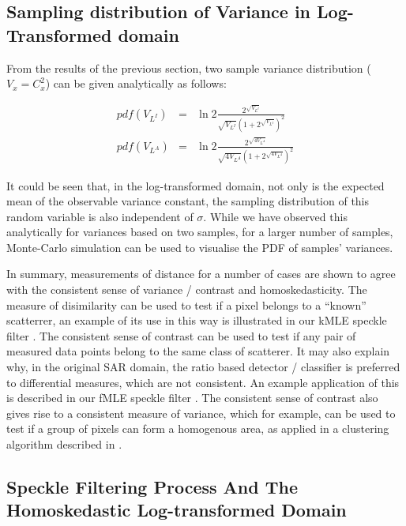 \documentclass[journal]{IEEEtran}
\begin{document}
\subsection{Sampling distribution of Variance in Log-Transformed domain}

From the results of the previous section, two sample variance distribution ($V_x = C_x^2$) can be given analytically as 
follows:

\begin{eqnarray}
pdf(V_{L^I}) &=& 
	\ln2 \frac{ 2^{\sqrt{V_{L^I}}}}{\sqrt{V_{L^I}} \left( 1+2^{\sqrt{V_{L^I}}} \right)^2} \\
pdf(V_{L^A}) &=&
	\ln2 \frac{2^{\sqrt{4V_{L^A}}}}{\sqrt{4V_{L^A}} \left( 1+2^{\sqrt{4V_{L^A}}} \right)^2} 
\end{eqnarray}

It could be seen that, in the log-transformed domain, not only is the expected mean of the observable variance 
constant, the sampling distribution of this random variable is also independent of $\sigma$. 
While we have observed this analytically for variances based on two samples, for a larger number of samples, 
Monte-Carlo simulation can be used to visualise the PDF of samples' variances. 

In summary, measurements of distance for a number of cases are shown to agree with the 
consistent sense of variance / contrast and homoskedasticity. The measure of disimilarity can be used to test 
if a pixel belongs to a ``known'' scatterrer, an example of its use in this way is illustrated in our kMLE speckle 
filter \cite{Le_2010_ACRS}. The consistent sense of contrast can be used to test if any pair of measured data points belong to 
the same class of scatterer. It may also explain why, in the original SAR domain, the ratio based 
detector / classifier is preferred to differential measures, which are not consistent. 
An example application of this is described in our fMLE speckle filter \cite{Le_2011_ACRS}. The consistent sense 
of contrast also gives rise to a consistent measure of variance, which for example, can be used to test 
if a group of pixels can form a homogenous area, as applied in a clustering 
algorithm described in \cite{Le_2010_ACRS}.

\subsection{ Speckle Filtering Process And The Homoskedastic Log-transformed Domain}
\label{sec:schema_log_images}
\end{document}
